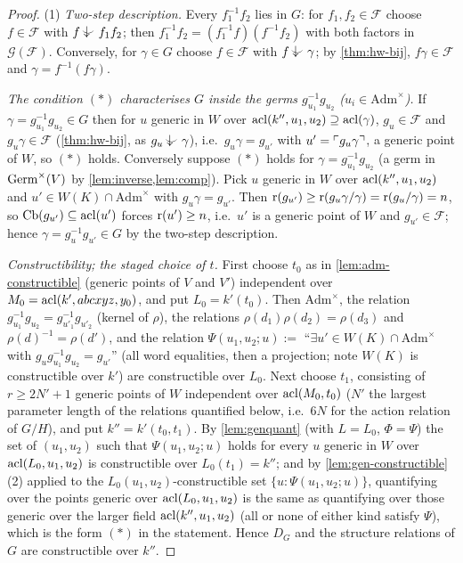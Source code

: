 \begin{proof}
(1) \emph{Two-step description.}  Every $f_1^{-1}f_2$ lies in $G$: for $f_1,f_2\in\mathcal F$
choose $f\in\mathcal F$ with $f\ind{}f_1f_2$; then $f_1^{-1}f_2=(f_1^{-1}f)(f^{-1}f_2)$ with
both factors in $\mathcal G(\mathcal F)$.  Conversely, for $\gamma\in G$ choose $f\in\mathcal F$
with $f\ind{}\gamma$; by \cref{thm:hw-bij}, $f\gamma\in\mathcal F$ and $\gamma=f^{-1}(f\gamma)$.

\emph{The condition $(\ast)$ characterises $G$ inside the germs $g_{u_1}^{-1}g_{u_2}$
($u_i\in\mathrm{Adm}^\times$).}  If $\gamma=g_{u_1}^{-1}g_{u_2}\in G$ then for $u$ generic in
$W$ over $\operatorname{acl}(k'',u_1,u_2)\supseteq\operatorname{acl}(\gamma)$, $g_u\in\mathcal F$ and $g_u\gamma\in\mathcal F$
(\cref{thm:hw-bij}, as $g_u\ind{}\gamma$), i.e.\ $g_u\gamma=g_{u'}$ with
$u'=\ulcorner g_u\gamma\urcorner$, a generic point of $W$, so $(\ast)$ holds.
Conversely suppose $(\ast)$ holds for $\gamma=g_{u_1}^{-1}g_{u_2}$ (a germ in
$\operatorname{Germ}^\times(V)$ by \cref{lem:inverse,lem:comp}).  Pick $u$ generic in $W$ over
$\operatorname{acl}(k'',u_1,u_2)$ and $u'\in W(K)\cap\mathrm{Adm}^\times$ with $g_u\gamma=g_{u'}$.  Then
$\operatorname{r}(g_{u'})\ge\operatorname{r}(g_u\gamma/\gamma)=\operatorname{r}(g_u/\gamma)=n$, so $\operatorname{Cb}(g_{u'})\subseteq\operatorname{acl}(u')$ forces
$\operatorname{r}(u')\ge n$, i.e.\ $u'$ is a generic point of $W$ and $g_{u'}\in\mathcal F$; hence
$\gamma=g_u^{-1}g_{u'}\in G$ by the two-step description.

\emph{Constructibility; the staged choice of $t$.}  First choose $t_0$ as in
\cref{lem:adm-constructible} (generic points of $V$ and $V'$) independent over
$M_0=\operatorname{acl}(k',abcxyz,y_0)$, and put $L_0=k'(t_0)$.  Then $\mathrm{Adm}^\times$, the relation
$g_{u_1}^{-1}g_{u_2}=g_{u'_1}^{-1}g_{u'_2}$ (kernel of $\rho$), the relations
$\rho(d_1)\rho(d_2)=\rho(d_3)$ and $\rho(d)^{-1}=\rho(d')$, and the relation
$\Psi(u_1,u_2;u):=$ ``$\exists u'\in W(K)\cap\mathrm{Adm}^\times$ with
$g_ug_{u_1}^{-1}g_{u_2}=g_{u'}$'' (all word equalities, then a projection; note $W(K)$ is
constructible over $k'$) are constructible over $L_0$.  Next choose $t_1$, consisting of
$r\ge2N'+1$ generic points of $W$ independent over $\operatorname{acl}(M_0,t_0)$ ($N'$ the largest
parameter length of the relations quantified below, i.e.\ $6N$ for the action relation of
$G/H$), and put
$k''=k'(t_0,t_1)$.  By \cref{lem:genquant} (with $L=L_0$, $\Phi=\Psi$) the set of
$(u_1,u_2)$ such that $\Psi(u_1,u_2;u)$ holds for every $u$ generic in $W$ over
$\operatorname{acl}(L_0,u_1,u_2)$ is constructible over $L_0(t_1)=k''$; and by
\cref{lem:gen-constructible}(2) applied to the $L_0(u_1,u_2)$-constructible set
$\{u:\Psi(u_1,u_2;u)\}$, quantifying over the points generic over $\operatorname{acl}(L_0,u_1,u_2)$ is the
same as quantifying over those generic over the larger field $\operatorname{acl}(k'',u_1,u_2)$ (all or
none of either kind satisfy $\Psi$), which is the form $(\ast)$ in the statement.  Hence
$D_G$ and the structure relations of $G$ are constructible over $k''$.


\end{proof}
